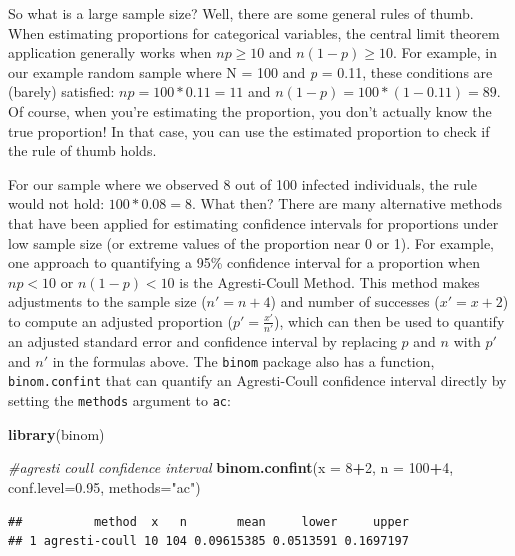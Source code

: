 \documentclass[
]{book}
\newenvironment{Shaded}{\begin{snugshade}}{\end{snugshade}}
\newcommand{\AttributeTok}[1]{\textcolor[rgb]{0.13,0.29,0.53}{#1}}
\newcommand{\CommentTok}[1]{\textcolor[rgb]{0.56,0.35,0.01}{\textit{#1}}}
\newcommand{\DecValTok}[1]{\textcolor[rgb]{0.00,0.00,0.81}{#1}}
\newcommand{\FloatTok}[1]{\textcolor[rgb]{0.00,0.00,0.81}{#1}}
\newcommand{\FunctionTok}[1]{\textcolor[rgb]{0.13,0.29,0.53}{\textbf{#1}}}
\newcommand{\NormalTok}[1]{#1}
\newcommand{\SpecialCharTok}[1]{\textcolor[rgb]{0.81,0.36,0.00}{\textbf{#1}}}
\newcommand{\StringTok}[1]{\textcolor[rgb]{0.31,0.60,0.02}{#1}}
\begin{document}
So what is a large sample size? Well, there are some general rules of thumb. When estimating proportions for categorical variables, the central limit theorem application generally works when \(np \geq 10\) and \(n(1-p) \geq 10\). For example, in our example random sample where N = 100 and \emph{p} = 0.11, these conditions are (barely) satisfied: \(np = 100*0.11 = 11\) and \(n(1-p) = 100*(1-0.11) = 89\). Of course, when you're estimating the proportion, you don't actually know the true proportion! In that case, you can use the estimated proportion to check if the rule of thumb holds.

For our sample where we observed 8 out of 100 infected individuals, the rule would not hold: \(100*0.08 = 8\). What then? There are many alternative methods that have been applied for estimating confidence intervals for proportions under low sample size (or extreme values of the proportion near 0 or 1). For example, one approach to quantifying a 95\% confidence interval for a proportion when \(np < 10\) or \(n(1-p) < 10\) is the Agresti-Coull Method. This method makes adjustments to the sample size (\(n'=n+4\)) and number of successes (\(x'=x+2\)) to compute an adjusted proportion (\(p'=\frac{x'}{n'}\)), which can then be used to quantify an adjusted standard error and confidence interval by replacing \(p\) and \(n\) with \(p'\) and \(n'\) in the formulas above. The \texttt{binom} package also has a function, \texttt{binom.confint} that can quantify an Agresti-Coull confidence interval directly by setting the \texttt{methods} argument to \texttt{ac}:

\begin{Shaded}
\begin{Highlighting}[]
\FunctionTok{library}\NormalTok{(binom)}

\CommentTok{\#agresti coull confidence interval}
\FunctionTok{binom.confint}\NormalTok{(}\AttributeTok{x =} \DecValTok{8}\SpecialCharTok{+}\DecValTok{2}\NormalTok{, }\AttributeTok{n =} \DecValTok{100}\SpecialCharTok{+}\DecValTok{4}\NormalTok{, }\AttributeTok{conf.level=}\FloatTok{0.95}\NormalTok{, }\AttributeTok{methods=}\StringTok{"ac"}\NormalTok{)}
\end{Highlighting}
\end{Shaded}

\begin{verbatim}
##          method  x   n       mean     lower     upper
## 1 agresti-coull 10 104 0.09615385 0.0513591 0.1697197
\end{verbatim}
\end{document}
